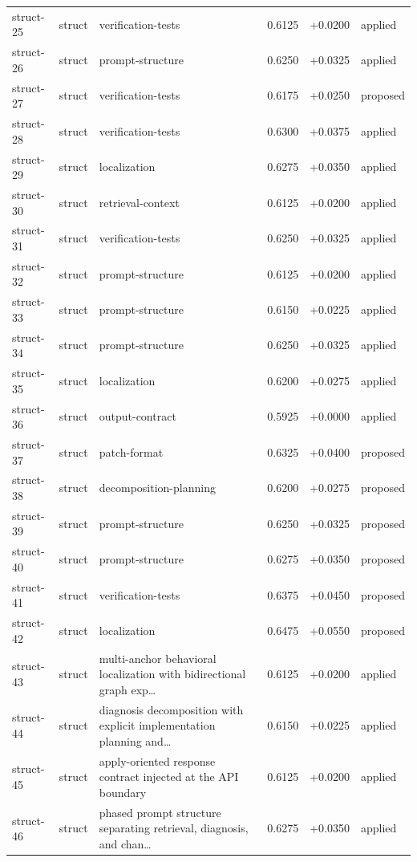 \begin{center}
\begin{longtable}{llp{5.2cm}rrl}
struct-25 & struct & verification-tests & 0.6125 & +0.0200 & applied \\
struct-26 & struct & prompt-structure & 0.6250 & +0.0325 & applied \\
struct-27 & struct & verification-tests & 0.6175 & +0.0250 & proposed \\
struct-28 & struct & verification-tests & 0.6300 & +0.0375 & applied \\
struct-29 & struct & localization & 0.6275 & +0.0350 & applied \\
struct-30 & struct & retrieval-context & 0.6125 & +0.0200 & applied \\
struct-31 & struct & verification-tests & 0.6250 & +0.0325 & applied \\
struct-32 & struct & prompt-structure & 0.6125 & +0.0200 & applied \\
struct-33 & struct & prompt-structure & 0.6150 & +0.0225 & applied \\
struct-34 & struct & prompt-structure & 0.6250 & +0.0325 & applied \\
struct-35 & struct & localization & 0.6200 & +0.0275 & applied \\
struct-36 & struct & output-contract & 0.5925 & +0.0000 & applied \\
struct-37 & struct & patch-format & 0.6325 & +0.0400 & proposed \\
struct-38 & struct & decomposition-planning & 0.6200 & +0.0275 & proposed \\
struct-39 & struct & prompt-structure & 0.6250 & +0.0325 & proposed \\
struct-40 & struct & prompt-structure & 0.6275 & +0.0350 & proposed \\
struct-41 & struct & verification-tests & 0.6375 & +0.0450 & proposed \\
struct-42 & struct & localization & 0.6475 & +0.0550 & proposed \\
struct-43 & struct & multi-anchor behavioral localization with bidirectional graph exp\ldots{} & 0.6125 & +0.0200 & applied \\
struct-44 & struct & diagnosis decomposition with explicit implementation planning and\ldots{} & 0.6150 & +0.0225 & applied \\
struct-45 & struct & apply-oriented response contract injected at the API boundary & 0.6125 & +0.0200 & applied \\
struct-46 & struct & phased prompt structure separating retrieval, diagnosis, and chan\ldots{} & 0.6275 & +0.0350 & applied \\

\end{longtable}
\end{center}
